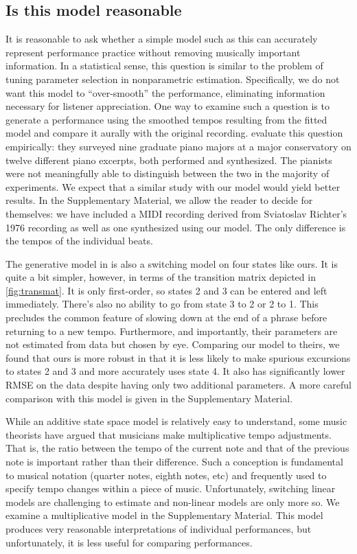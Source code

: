 \documentclass[aoas]{imsart}
\begin{document}
\subsection{Is this model reasonable}
\label{sec:this-model-reas}

It is reasonable to ask whether a simple model such as this can
accurately represent performance practice without removing musically important
information. In a statistical sense, this question is similar to the
problem of tuning parameter selection in nonparametric
estimation. Specifically, we do not want this model to
``over-smooth'' the performance, eliminating information necessary for
listener appreciation. One way to examine such a question 
is to generate a performance using the smoothed tempos resulting from
the fitted model and compare it aurally with the original recording.
\citet{GuRaphael2012} evaluate this question empirically: they surveyed nine
graduate piano majors at a 
major conservatory on twelve different piano excerpts, both performed
and synthesized. The pianists
were not meaningfully able to distinguish between the two in the
majority of experiments. We expect that a similar
study with our model would yield better results. In the Supplementary
Material, we allow the reader to decide for themselves: we have
included a MIDI recording derived from Sviatoslav Richter's 1976
recording as well as one synthesized using our model. The only
difference is the tempos of the individual beats.

The generative model in \citet{GuRaphael2012} is also a switching
model on four states like ours. It is quite a bit simpler, however, in terms of
the transition matrix depicted in \autoref{fig:transmat}. It is only first-order, so states 2 and 3 can
be entered and left immediately. There's also no ability to go from
state 3 to 2 or 2 to 1. This precludes the common feature of
slowing down at the end of a phrase before returning to a new tempo. Furthermore, and importantly, their parameters are not
estimated from data but chosen by eye. Comparing our model to theirs, we found that
ours is more robust in that it is less likely to make spurious
excursions to states 2 and 3 and more accurately uses state 4. It also
has significantly lower RMSE on the data despite having only two
additional parameters. A more careful comparison with this model is given in the
Supplementary Material.

While an additive state space model is relatively easy to understand,
some music theorists \citep[for example]{Mead2007} have argued that
musicians make multiplicative tempo adjustments. That is, the ratio
between the tempo of the current note and that of the previous note is
important rather than their difference. Such a conception is
fundamental to musical notation (quarter notes, eighth notes, etc) and
frequently used to specify tempo changes within a piece of
music. Unfortunately, switching linear models are challenging to
estimate and non-linear models are only more so. We examine a
multiplicative model in the Supplementary Material. This model produces
very reasonable interpretations of individual performances, but
unfortunately, it is less
useful for comparing performances.  
\end{document}
